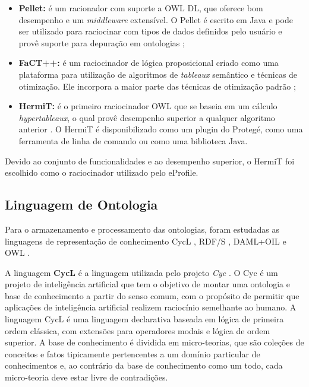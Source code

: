 \begin{itemize}

\item {\bf Pellet:} é um racionador com suporte a OWL DL, que oferece bom desempenho e um {\em middleware} extensível. O Pellet é escrito em Java e pode ser utilizado para raciocinar com tipos de dados definidos pelo usuário e provê suporte para depuração em ontologias \cite{sirin05};

\item {\bf FaCT++:} é um raciocinador de lógica proposicional criado como uma plataforma para utilização de algoritmos de {\em tableaux} semântico e técnicas de otimização. Ele incorpora a maior parte das técnicas de otimização padrão \cite{tsarkov06};

\item {\bf HermiT:} é o primeiro raciocinador OWL que se baseia em um cálculo {\em hypertableaux}, o qual provê desempenho superior a qualquer algoritmo anterior \cite{motik09}. O HermiT é disponibilizado como um plugin do Protegé, como uma ferramenta de linha de comando ou como uma biblioteca Java.

\end{itemize}

Devido ao conjunto de funcionalidades e ao desempenho superior, o HermiT foi escolhido como o raciocinador utilizado pelo eProfile.


\subsection{Linguagem de Ontologia}
\label{sec:ling_ontologia}

Para o armazenamento e processamento das ontologias, foram estudadas as linguagens de representação de conhecimento CycL \cite{lenat89}, RDF/S \cite{rdfs}, DAML+OIL \cite{daconta03} e OWL \cite{daconta03}.

A linguagem \textbf{CycL} é a linguagem utilizada pelo projeto \emph{Cyc} \cite{lenat89}. O Cyc é um projeto de inteligência artificial que tem o objetivo de montar uma ontologia e base de conhecimento a partir do senso comum, com o propósito de permitir que aplicações de inteligência artificial realizem raciocínio semelhante ao humano. A linguagem CycL é uma linguagem declarativa baseada em lógica de primeira ordem clássica, com extensões para operadores modais e lógica de ordem superior. A base de conhecimento é dividida em micro-teorias, que são coleções de conceitos e fatos tipicamente pertencentes a um domínio particular de conhecimentos e, ao contrário da base de conhecimento como um todo, cada micro-teoria deve estar livre de contradições.

